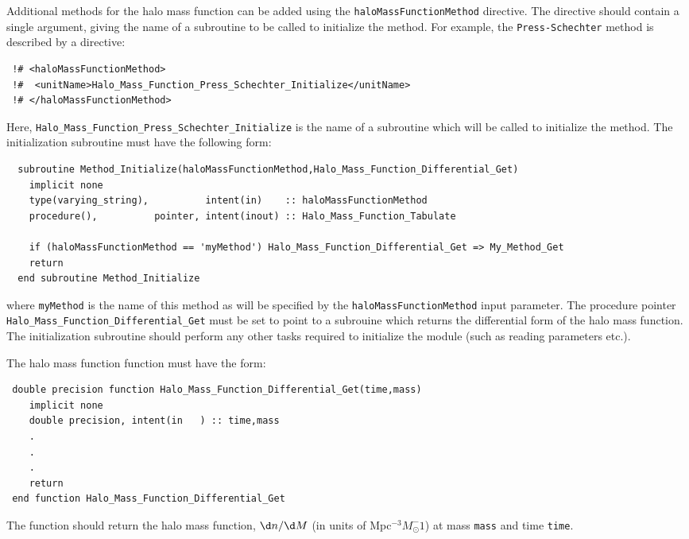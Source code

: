 Additional methods for the halo mass function can be added using the {\tt haloMassFunctionMethod} directive. The directive should contain a single argument, giving the name of a subroutine to be called to initialize the method. For example, the {\tt Press-Schechter} method is described by a directive:
\begin{verbatim}
 !# <haloMassFunctionMethod>
 !#  <unitName>Halo_Mass_Function_Press_Schechter_Initialize</unitName>
 !# </haloMassFunctionMethod>
\end{verbatim}
Here, {\tt Halo\_Mass\_Function\_Press\_Schechter\_Initialize} is the name of a subroutine which will be called to initialize the method. The initialization subroutine must have the following form:
\begin{verbatim}
  subroutine Method_Initialize(haloMassFunctionMethod,Halo_Mass_Function_Differential_Get)
    implicit none
    type(varying_string),          intent(in)    :: haloMassFunctionMethod
    procedure(),          pointer, intent(inout) :: Halo_Mass_Function_Tabulate
    
    if (haloMassFunctionMethod == 'myMethod') Halo_Mass_Function_Differential_Get => My_Method_Get
    return
  end subroutine Method_Initialize
\end{verbatim}
where {\tt myMethod} is the name of this method as will be specified by the {\tt haloMassFunctionMethod} input parameter. The procedure pointer {\tt Halo\_Mass\_Function\_Differential\_Get} must be set to point to a subrouine which returns the differential form of the halo mass function. The initialization subroutine should perform any other tasks required to initialize the module (such as reading parameters etc.).

The halo mass function function must have the form:
\begin{verbatim}
 double precision function Halo_Mass_Function_Differential_Get(time,mass)
    implicit none
    double precision, intent(in   ) :: time,mass
    .
    .
    .
    return
 end function Halo_Mass_Function_Differential_Get
\end{verbatim}
The function should return the halo mass function, $\d n/\d M$ (in units of Mpc$^{-3} M_\odot^-1$) at mass {\tt mass} and time {\tt time}.

